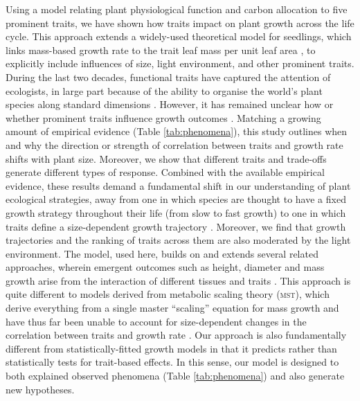 \documentclass[a4paper,11pt]{article}
\begin{document}
Using a model relating plant physiological function and carbon allocation to five prominent traits, we have shown how traits impact on plant growth across the life cycle. This approach extends a widely-used theoretical model for seedlings, which links mass-based growth rate to the trait leaf mass per unit leaf area \citep{Lambers-1992, Wright-2000}, to explicitly include influences of size, light environment, and other prominent traits. During the last two decades, functional traits have captured the attention of ecologists, in large part because of the ability to organise the world's plant species along standard dimensions \citep{Westoby-2002}. However, it has remained unclear how or whether prominent traits influence growth outcomes \citep{Poorter-2008, Wright-2010,Paine-2015}. Matching a growing amount of empirical evidence (Table \ref{tab:phenomena}), this study outlines when and why the direction or strength of correlation between traits and growth rate shifts with plant size. Moreover, we show that different traits and trade-offs generate different types of response. Combined with the available empirical evidence, these results demand a fundamental shift in our understanding of plant ecological strategies, away from one in which species are thought to have a fixed growth strategy throughout their life (from slow to fast growth) \citep[e.g.][]{Grime-1977, Adler-2014, Paine-2015} to one in which traits define a size-dependent growth trajectory \citep{Gibert-2016}. Moreover, we find that growth trajectories and the ranking of traits across them are also moderated by the light environment. The {\plant} model, used here, builds on and extends several related approaches, wherein emergent outcomes such as height, diameter and mass growth arise from the interaction of different tissues and traits \citep[e.g.][]{Givnish-1988, Makela-1997, Moorcroft-2001}. This approach is quite different to models derived from metabolic scaling theory (\textsc{mst}), which derive everything from a single master ``scaling'' equation for mass growth and have thus far been unable to account for size-dependent changes in the correlation between traits and growth rate \citep{Enquist-1999, Enquist-2007}. Our approach is also fundamentally different from statistically-fitted growth models \citep[e.g.][]{Herault-2011, Ruger-2012, Iida-2014} in that it predicts rather than statistically tests for trait-based effects. In this sense, our model is designed to both explained observed phenomena (Table \ref{tab:phenomena}) and also generate new hypotheses.
\end{document}
